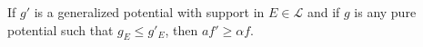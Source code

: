 If $g'$ is a generalized potential with support in $E \in \mathcal{L}$ and if $g$ is any pure potential such that $g_E \leq g'_E$, then $af' \geq \alpha f$.

